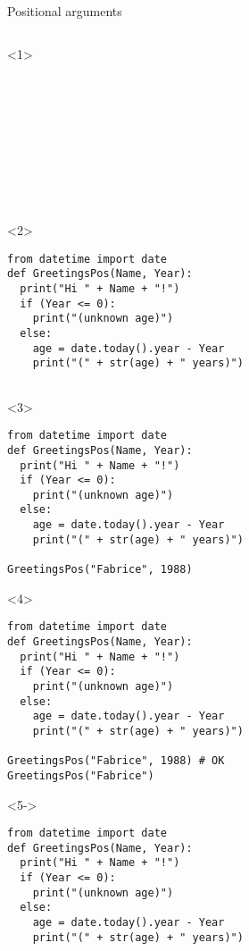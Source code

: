 \begin{frame}[fragile]{Positional arguments}

  \begin{columns}[onlytextwidth]
    \begin{column}{\textwidth}

      \begin{onlyenv}<1>
        \begin{lstlisting}[style=python]










 \end{lstlisting}
      \end{onlyenv}

      \begin{onlyenv}<2>
        \begin{lstlisting}[style=python]
from datetime import date
def GreetingsPos(Name, Year):
  print("Hi " + Name + "!")
  if (Year <= 0):
    print("(unknown age)")
  else:
    age = date.today().year - Year
    print("(" + str(age) + " years)")


 \end{lstlisting}
      \end{onlyenv}

      \begin{onlyenv}<3>
        \begin{lstlisting}[style=python]
from datetime import date
def GreetingsPos(Name, Year):
  print("Hi " + Name + "!")
  if (Year <= 0):
    print("(unknown age)")
  else:
    age = date.today().year - Year
    print("(" + str(age) + " years)")

GreetingsPos("Fabrice", 1988)
 \end{lstlisting}
      \end{onlyenv}

      \begin{onlyenv}<4>
        \begin{lstlisting}[style=python]
from datetime import date
def GreetingsPos(Name, Year):
  print("Hi " + Name + "!")
  if (Year <= 0):
    print("(unknown age)")
  else:
    age = date.today().year - Year
    print("(" + str(age) + " years)")

GreetingsPos("Fabrice", 1988) # OK
GreetingsPos("Fabrice") \end{lstlisting}
      \end{onlyenv}

      \begin{onlyenv}<5->
        \begin{lstlisting}[style=python]
from datetime import date
def GreetingsPos(Name, Year):
  print("Hi " + Name + "!")
  if (Year <= 0):
    print("(unknown age)")
  else:
    age = date.today().year - Year
    print("(" + str(age) + " years)")


\end{lstlisting}
\end{onlyenv}
\end{column}
\end{columns}
\end{frame}
